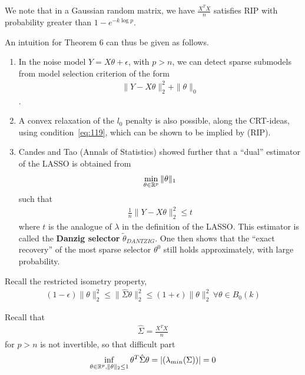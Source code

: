 We note that in a Gaussian random matrix, we have $\frac{X^{T} X}{n}$
satisfies RIP with probability greater than $1 - e^{-k \log p}$.

\begin{remark}
  An intuition for Theorem 6 can thus be given as follows.
  \begin{enumerate}
  \item In the noise model $Y = X \theta + \epsilon$, with $p > n$, we
    can detect sparse submodels from model selection criterion of the
    form
    \begin{align}
      \label{eq:145}
      \| Y - X \theta \|_{2}^{2} + \| \theta \|_{0}
    \end{align} .
  \item A convex relaxation of the $l_{0}$ penalty is also possible,
    along the CRT-ideas, using condition~\eqref{eq:119}, which can be
    shown to be implied by (RIP).
  \item Candes and Tao (Annals of Statistics) showed further that a
    ``dual'' estimator of the LASSO is obtained from
    \begin{align}
      \label{eq:146}
      \min_{\theta \in \mathbb{R}^{p}} \| \theta \|_{1}
    \end{align} such that
    \begin{align}
      \label{eq:147}
      \frac{1}{n} \| Y - X \theta \|_{2}^{2} \leq t
    \end{align} where $t$ is the analogue of $\lambda$ in the
    definition of the LASSO.  This estimator is called the
    \textbf{Danzig selector} $\tilde \theta_{DANTZIG}$.  One then
    shows that the ``exact recovery'' of the most sparse selector
    $\theta^{0}$ still holds approximately, with large probability.
  \end{enumerate}
\end{remark}


Recall the restricted isometry property,
\begin{align}
  \label{eq:150}
  (1-\epsilon) \| \theta \|_{2}^{2} \leq \| \hat \Sigma \theta
  \|_{2}^{2} \leq (1+\epsilon) \| \theta \|_{2}^{2} \, \forall \theta
  \in B_{0}(k)
\end{align}

Recall that
\begin{align}
  \label{eq:144}
  \hat \Sigma = \frac{X^{T} X}{n}
\end{align} for $p > n$ is not invertible, so that difficult part
\begin{align}
  \label{eq:148}
  \inf_{\theta \in \mathbb{R}^{p}, \| \theta \|_{2} \leq 1} \theta^{T} \hat
  \Sigma \theta = |(\lambda_{min}(\Sigma))| = 0
\end{align}


